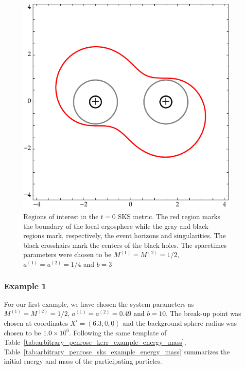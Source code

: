 \begin{figure}[!ht]
  \centering
  \includegraphics[width=\linewidth]{img/penrose_binaries/sks_regions.pdf}
  \caption{Regions of interest in the $t=0$ \ac{SKS} metric. The red region marks the boundary of the local ergosphere while the gray and black regions mark, respectively, the event horizons and singularities. The black crosshairs mark the centers of the black holes. The spacetimes parameters were chosen to be $M^{(1)} = M^{(2)} = 1/2$, $a^{(1)} = a^{(2)} = 1/4$ and $b = 3$}
  \label{fig:sks_ergo_plot}
\end{figure}

\subsubsection{Example 1}
\label{ch:sks_example_1}

For our first example, we have chosen the system parameters as $M^{(1)} = M^{(2)} = 1/2$, $a^{(1)} = a^{(2)} = 0.49$ and $b = 10$. The break-up point was chosen at coordinates $X^i = (6.3, 0, 0)$ and the background sphere radius was chosen to be $1.0 \times 10^6$. Following the same template of Table~\ref{tab:arbitrary_penrose_kerr_example_energy_mass}, Table~\ref{tab:arbitrary_penrose_sks_example_energy_mass} summarizes the initial energy and mass of the participating particles.

